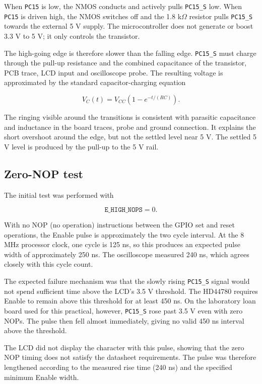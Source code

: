 \documentclass[11pt]{article}
\begin{document}
When \texttt{PC15} is low, the NMOS conducts and actively pulls
\texttt{PC15\_S} low. When \texttt{PC15} is driven high, the NMOS switches off
and the 1.8 k$\Omega$ resistor pulls \texttt{PC15\_S} towards the external
5 V supply. The microcontroller does not generate or boost 3.3 V to 5 V; it
only controls the transistor. 

The high-going edge is therefore slower than the falling edge.
\texttt{PC15\_S} must charge through the pull-up resistance and the combined
capacitance of the transistor, PCB trace, LCD input and oscilloscope probe.
The resulting voltage is approximated by the standard capacitor-charging
equation

\[
V_C(t)=V_{CC}\left(1-e^{-t/(RC)}\right).
\]

The ringing visible around the transitions is consistent with parasitic
capacitance and inductance in the board traces, probe and ground connection.
It explains the short overshoot around the edge, but not the settled level
near 5 V. The settled 5 V level is produced by the pull-up to the 5 V rail.

\subsection{Zero-NOP test}

The initial test was performed with

\[
\texttt{E\_HIGH\_NOPS}=0.
\]

With no NOP (no operation) instructions between the GPIO set and reset operations, the Enable
pulse is approximately the two cycle interval. At the 8 MHz processor clock, one cycle is 125 ns, so this produces an
expected pulse width of approximately 250 ns. The oscilloscope measured
240 ns, which agrees closely with this cycle count.

The expected failure mechanism was that the slowly rising
\texttt{PC15\_S} signal would not spend sufficient time above the LCD's
3.5 V threshold. The HD44780 requires Enable to remain above this
threshold for at least 450 ns. On the laboratory loan board used for this
practical, however, \texttt{PC15\_S} rose past 3.5 V even with zero NOPs.
The pulse then fell almost immediately, giving no valid 450 ns interval above
the threshold.

The LCD did not display the character with this pulse, showing that the zero NOP timing does not satisfy the datasheet requirements. The pulse was therefore lengthened according to the
measured rise time (240 ns) and the specified minimum Enable width.
\end{document}
